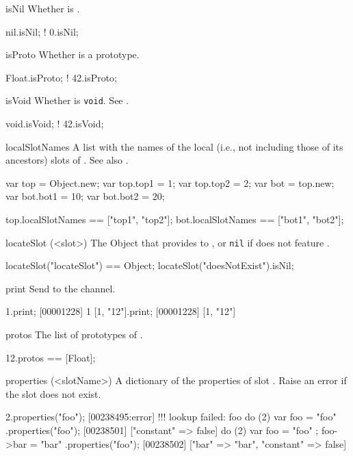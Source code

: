 \begin{urbiscriptapi}
\item[isNil]%
  Whether \this is .
\begin{urbiassert}
 nil.isNil;
!  0.isNil;
\end{urbiassert}

\item[isProto]%
  Whether \this is a prototype.
\begin{urbiassert}
 Float.isProto;
!   42.isProto;
\end{urbiassert}

\item[isVoid]%
  Whether \this is \lstinline|void|.  See .
\begin{urbiassert}
void.isVoid;
! 42.isVoid;
\end{urbiassert}

\item[localSlotNames]%
  A list with the names of the local (i.e., not including those of its
  ancestors) slots of \this.  See also .
\begin{urbiassert}
var top = Object.new;
var top.top1 = 1;
var top.top2 = 2;
var bot = top.new;
var bot.bot1 = 10;
var bot.bot2 = 20;

top.localSlotNames == ["top1", "top2"];
bot.localSlotNames == ["bot1", "bot2"];
\end{urbiassert}

\item[locateSlot](<slot>)%
  The Object that provides  to \this, or \lstinline|nil| if \this
  does not feature .
\begin{urbiassert}
locateSlot("locateSlot") == Object;
locateSlot("doesNotExist").isNil;
\end{urbiassert}

\item[print] Send \this to the  channel.
\begin{urbiscript}
1.print;
[00001228] 1
[1, "12"].print;
[00001228] [1, "12"]
\end{urbiscript}

\item[protos]
  The list of prototypes of \this.
\begin{urbiassert}
12.protos == [Float];
\end{urbiassert}

\item[properties](<slotName>)%
  A dictionary of the properties of slot .  Raise an error if
  the slot does not exist.
\begin{urbiscript}
2.properties("foo");
[00238495:error] !!! lookup failed: foo
do (2) { var foo = "foo" }.properties("foo");
[00238501] ["constant" => false]
do (2) { var foo = "foo" ; foo->bar = "bar" }.properties("foo");
[00238502] ["bar" => "bar", "constant" => false]
\end{urbiscript}


\end{urbiscriptapi}
